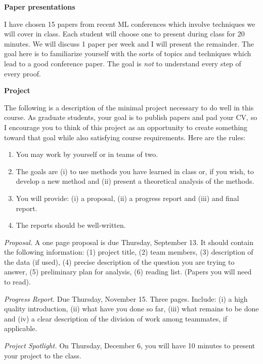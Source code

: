 \documentclass[10pt]{article}
\begin{document}
{\bf Paper presentations}

I have chosen 15 papers from recent ML conferences which involve
techniques we will cover in class. Each student will choose one to
present during class for 20 minutes. We will discuss 1 paper per week
and I will present the remainder. The goal here is to familiarize
yourself with the sorts of topics and techniques which lead to a good
conference paper. The goal is {\em not} to understand every step of
every proof.


{\bf Project}

The following is a description of the minimal project necessary to do
well in this course. As graduate students, your goal is to publish
papers and pad your CV, so I encourage you to think of this project as
an opportunity to create something toward that goal while also
satisfying course requirements. Here are the rules:
\begin{enumerate}
\item You may work by yourself or in teams of two.
\item The goals are (i) to use methods you have learned in class or, if you wish, to develop a
new method and (ii) present a theoretical analysis of the methods.
\item You will provide: (i) a proposal, (ii) a progress report and (iii) and final report.
\item The reports should be well-written.
\end{enumerate}

{\em Proposal.} A one page proposal is due Thursday, September 13. It
should contain the following information: (1) project title, (2) team
members, (3) description of the data (if used), (4) precise description of the
question you are trying to answer, (5) preliminary plan
for analysis, (6) reading list. (Papers you will need to read). 

{\em Progress Report.} Due Thursday, November 15. Three
pages. Include: (i) a high quality introduction, (ii) what have you
done so far, (iii) what remains to be done and (iv) a clear
description of the division of work among teammates, if applicable. 

{\em Project Spotlight.} On Thursday, December 6, you will have 10
minutes to present your project to the class. 
\end{document}
